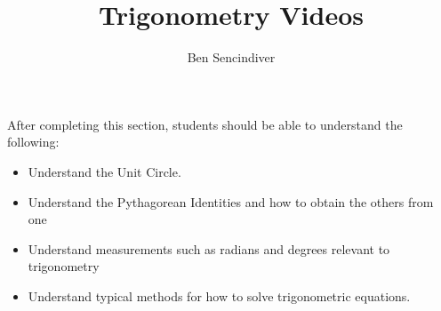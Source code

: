 \documentclass{ximera}
\title{Trigonometry Videos}
\author{Ben Sencindiver}
\begin{document}
\begin{abstract}
\end{abstract}

\maketitle

\begin{sectionOutcomes}
After completing this section, students should be able to understand the following:

\begin{itemize}
    \item Understand the Unit Circle.
    \item Understand the Pythagorean Identities and how to obtain the others
    from one
    \item Understand measurements such as radians and degrees relevant to trigonometry
    \item Understand typical methods for how to solve trigonometric equations.
\end{itemize}


\end{sectionOutcomes}
\end{document}
